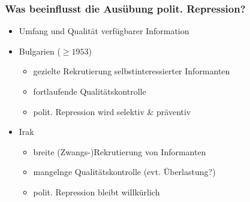 \documentclass{beamer}
\begin{document}
\begin{frame}
  \frametitle{Was beeinflusst die Ausübung polit. Repression?}
  \begin{itemize}
    \item Umfang und Qualität verfügbarer Information
    \item Bulgarien ($\ge 1953$)
    \begin{itemize}
      \item gezielte Rekrutierung selbstinteressierter Informanten
      \item fortlaufende Qualitätskontrolle
      \item polit. Repression wird selektiv \& präventiv
    \end{itemize}
    \item Irak
    \begin{itemize}
      \item breite (Zwangs-)Rekrutierung von Informanten
      \item mangelnge Qualitätskontrolle (evt. Überlastung?)
      \item polit. Repression bleibt willkürlich
    \end{itemize}
  \end{itemize}
\end{frame}
\end{document}
